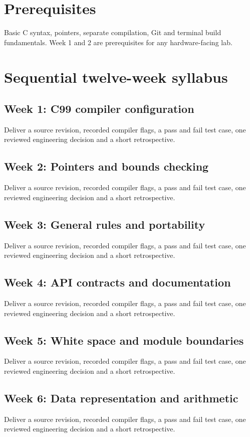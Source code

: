 \documentclass[10pt,letterpaper]{article}
\begin{document}
\makedoctitle
\makedocsummary
\section{Prerequisites}
Basic C syntax, pointers, separate compilation, Git and terminal build fundamentals. Week 1 and 2 are prerequisites for any hardware-facing lab.
\section{Sequential twelve-week syllabus}
\subsection*{Week 1: C99 compiler configuration}
Deliver a source revision, recorded compiler flags, a pass and fail test case, one reviewed engineering decision and a short retrospective.

\subsection*{Week 2: Pointers and bounds checking}
Deliver a source revision, recorded compiler flags, a pass and fail test case, one reviewed engineering decision and a short retrospective.

\subsection*{Week 3: General rules and portability}
Deliver a source revision, recorded compiler flags, a pass and fail test case, one reviewed engineering decision and a short retrospective.

\subsection*{Week 4: API contracts and documentation}
Deliver a source revision, recorded compiler flags, a pass and fail test case, one reviewed engineering decision and a short retrospective.

\subsection*{Week 5: White space and module boundaries}
Deliver a source revision, recorded compiler flags, a pass and fail test case, one reviewed engineering decision and a short retrospective.

\subsection*{Week 6: Data representation and arithmetic}
Deliver a source revision, recorded compiler flags, a pass and fail test case, one reviewed engineering decision and a short retrospective.
\end{document}
